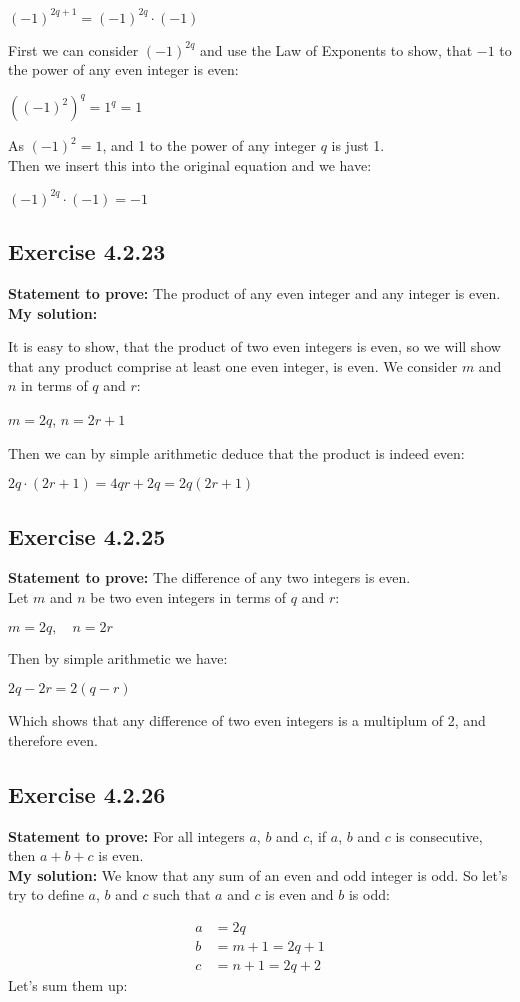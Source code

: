 \documentclass{article}
\newcommand{\cent}[1]{\begin{center}#1\end{center}}
\newcommand{\mAlign}[1]{\begin{align*}#1\end{align*}}
\newcommand{\Prove}{\textbf{Statement to prove: }}
\newcommand{\Solution}{\textbf{My solution: }}
\newcommand{\QED}{\boxed{}}
\newcommand{\Exercise}[1]{\subsection*{Exercise #1}}
\begin{document}
	\cent{$(-1)^{2q + 1} = (-1)^{2q} \cdot (-1)$}
	
	First we can consider $(-1)^{2q}$ and use the Law of Exponents to show, that $-1$ to the power of any even integer is even:
	
	\cent{$((-1)^2)^q = 1^q = 1$}
	
	As $(-1)^2 = 1$, and 1 to the power of any integer $q$ is just 1.\\
	
	Then we insert this into the original equation and we have:
	
	\cent{$(-1)^{2q} \cdot (-1) = -1$}
	
	\QED
	
	\Exercise{4.2.23}
	
	\Prove
	The product of any even integer and any integer is even.\\
	
	\Solution
	
	It is easy to show, that the product of two even integers is even, so we will show that any product comprise at least one even integer, is even. We consider $m$ and $n$ in terms of $q$ and $r$:
	
	\cent{$m = 2q$, \quad $n = 2r+1$}
	
	Then we can by simple arithmetic deduce that the product is indeed even:
	
	\cent{$ 2q \cdot (2r+1) = 4qr+2q = 2q(2r+1) $}
	
	\QED
	
	\Exercise{4.2.25}
	
	\Prove
	The difference of any two integers is even.\\
	
	Let $m$ and $n$ be two even integers in terms of $q$ and $r$: 
	
	\cent{$m = 2q, \quad n = 2r$}
	
	Then by simple arithmetic we have:
	\cent{$2q - 2r = 2(q-r)$}
	
	Which shows that any difference of two even integers is a multiplum of 2, and therefore even.
	\QED
	
	\Exercise{4.2.26}
	\Prove
	For all integers $a$, $b$ and $c$, if $a$, $b$ and $c$ is consecutive, then $a+b+c$ is even.\\
	
	\Solution
	We know that any sum of an even and odd integer is odd. So let's try to define $a$, $b$ and $c$ such that $a$ and $c$ is even and $b$ is odd:
	
	\mAlign{a &= 2q\\
					b &= m + 1 = 2q+1 \\
					c &= n + 1 = 2q+2}
	Let's sum them up:
	
\end{document}
